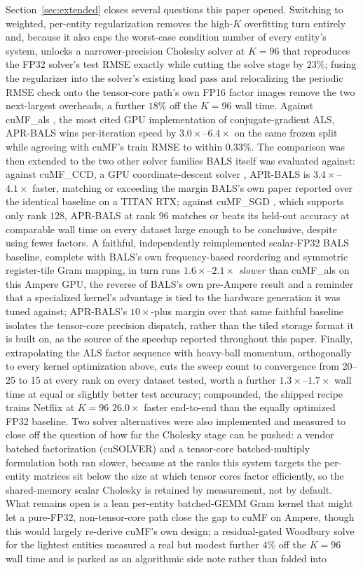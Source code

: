 Section~\ref{sec:extended} closes several questions this paper opened. Switching to weighted, per-entity regularization removes the high-$K$ overfitting turn entirely and, because it also caps the worst-case condition number of every entity's system, unlocks a narrower-precision Cholesky solver at $K=96$ that reproduces the FP32 solver's test RMSE exactly while cutting the solve stage by $23\%$; fusing the regularizer into the solver's existing load pass and relocalizing the periodic RMSE check onto the tensor-core path's own FP16 factor images remove the two next-largest overheads, a further $18\%$ off the $K=96$ wall time. Against cuMF\_als \cite{tan2016faster}, the most cited GPU implementation of conjugate-gradient ALS, APR-BALS wins per-iteration speed by $3.0\times$--$6.4\times$ on the same frozen split while agreeing with cuMF's train RMSE to within $0.33\%$. The comparison was then extended to the two other solver families BALS itself was evaluated against: against cuMF\_CCD, a GPU coordinate-descent solver \cite{yu2012scalable}, APR-BALS is $3.4\times$--$4.1\times$ faster, matching or exceeding the margin BALS's own paper reported over the identical baseline on a TITAN RTX; against cuMF\_SGD \cite{xie2017cumf}, which supports only rank $128$, APR-BALS at rank $96$ matches or beats its held-out accuracy at comparable wall time on every dataset large enough to be conclusive, despite using fewer factors. A faithful, independently reimplemented scalar-FP32 BALS baseline, complete with BALS's own frequency-based reordering and symmetric register-tile Gram mapping, in turn runs $1.6\times$--$2.1\times$ \textit{slower} than cuMF\_als on this Ampere GPU, the reverse of BALS's own pre-Ampere result and a reminder that a specialized kernel's advantage is tied to the hardware generation it was tuned against; APR-BALS's $10\times$-plus margin over that same faithful baseline isolates the tensor-core precision dispatch, rather than the tiled storage format it is built on, as the source of the speedup reported throughout this paper. Finally, extrapolating the ALS factor sequence with heavy-ball momentum, orthogonally to every kernel optimization above, cuts the sweep count to convergence from 20--25 to 15 at every rank on every dataset tested, worth a further $1.3\times$--$1.7\times$ wall time at equal or slightly better test accuracy; compounded, the shipped recipe trains Netflix at $K=96$ $26.0\times$ faster end-to-end than the equally optimized FP32 baseline. Two solver alternatives were also implemented and measured to close off the question of how far the Cholesky stage can be pushed: a vendor batched factorization (cuSOLVER) and a tensor-core batched-multiply formulation both ran slower, because at the ranks this system targets the per-entity matrices sit below the size at which tensor cores factor efficiently, so the shared-memory scalar Cholesky is retained by measurement, not by default. What remains open is a lean per-entity batched-GEMM Gram kernel that might let a pure-FP32, non-tensor-core path close the gap to cuMF on Ampere, though this would largely re-derive cuMF's own design; a residual-gated Woodbury solve for the lightest entities measured a real but modest further $4\%$ off the $K=96$ wall time and is parked as an algorithmic side note rather than folded into 